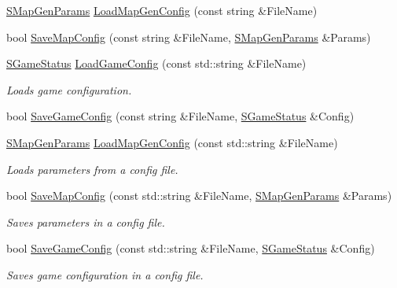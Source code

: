 \begin{DoxyCompactItemize}
\item 
\hyperlink{struct_chase_game_1_1_s_map_gen_params}{S\-Map\-Gen\-Params} \hyperlink{namespace_chase_game_a4779af792d3de8e274049bf2019e0343}{Load\-Map\-Gen\-Config} (const string \&File\-Name)
\item 
bool \hyperlink{namespace_chase_game_a98e8d90127c802c1445266e39966c3fb}{Save\-Map\-Config} (const string \&File\-Name, \hyperlink{struct_chase_game_1_1_s_map_gen_params}{S\-Map\-Gen\-Params} \&Params)
\item 
\hyperlink{struct_chase_game_1_1_s_game_status}{S\-Game\-Status} \hyperlink{namespace_chase_game_addd460052ec5a5fe3010665ca84b07ec}{Load\-Game\-Config} (const std\-::string \&File\-Name)
\begin{DoxyCompactList}\small\item\em Loads game configuration. \end{DoxyCompactList}\item 
bool \hyperlink{namespace_chase_game_a39f8b039151b1a3eef82fdc1c6f52091}{Save\-Game\-Config} (const string \&File\-Name, \hyperlink{struct_chase_game_1_1_s_game_status}{S\-Game\-Status} \&Config)
\item 
\hyperlink{struct_chase_game_1_1_s_map_gen_params}{S\-Map\-Gen\-Params} \hyperlink{namespace_chase_game_a9c5b5d91cb4251cae461faa4ace8a0cf}{Load\-Map\-Gen\-Config} (const std\-::string \&File\-Name)
\begin{DoxyCompactList}\small\item\em Loads parameters from a config file. \end{DoxyCompactList}\item 
bool \hyperlink{namespace_chase_game_a4c62f61c6aac5bf06292aa51294fd211}{Save\-Map\-Config} (const std\-::string \&File\-Name, \hyperlink{struct_chase_game_1_1_s_map_gen_params}{S\-Map\-Gen\-Params} \&Params)
\begin{DoxyCompactList}\small\item\em Saves parameters in a config file. \end{DoxyCompactList}\item 
bool \hyperlink{namespace_chase_game_a561c85a018e34c8baa21f7f500a3c9c7}{Save\-Game\-Config} (const std\-::string \&File\-Name, \hyperlink{struct_chase_game_1_1_s_game_status}{S\-Game\-Status} \&Config)
\begin{DoxyCompactList}\small\item\em Saves game configuration in a config file. \end{DoxyCompactList}\item 

\end{DoxyCompactItemize}
